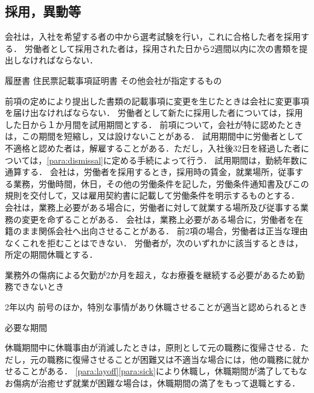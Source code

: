 \documentclass[11pt,a4paper]{jsarticle}
\begin{document}
\subsection{採用，異動等}
会社は，入社を希望する者の中から選考試験を行い，これに合格した者を採用する．
労働者として採用された者は，採用された日から2週間以内に次の書類を提出しなければならない．
\begin{enumerate}
	\itm 履歴書
	\itm 住民票記載事項証明書
	\itm その他会社が指定するもの
\end{enumerate}
\term
前項の定めにより提出した書類の記載事項に変更を生じたときは会社に変更事項を届け出なければならない．
労働者として新たに採用した者については，採用した日から１か月間を試用期間とする．
\term
前項について，会社が特に認めたときは，この期間を短縮し，又は設けないことがある．
\term
試用期間中に労働者として不適格と認めた者は，解雇することがある．ただし，入社後32日を経過した者については，\ref{para:dismissal}に定める手続によって行う．
\term
試用期間は，勤続年数に通算する．
会社は，労働者を採用するとき，採用時の賃金，就業場所，従事する業務，労働時間，休日，その他の労働条件を記した，労働条件通知書及びこの規則を交付して，又は雇用契約書に記載して労働条件を明示するものとする．
会社は，業務上必要がある場合に，労働者に対して就業する場所及び従事する業務の変更を命ずることがある．
\term
会社は，業務上必要がある場合に，労働者を在籍のまま関係会社へ出向させることがある．
\term
前2項の場合，労働者は正当な理由なくこれを拒むことはできない．
\label{para:layoff}
労働者が，次のいずれかに該当するときは，所定の期間休職とする．
\begin{enumerate}
	\itm 業務外の傷病による欠勤が2か月を超え，なお療養を継続する必要があるため勤務できないとき\par 2年以内
	\label{para:sick}
	\itm 前号のほか，特別な事情があり休職させることが適当と認められるとき\par 必要な期間
\end{enumerate}
\term
休職期間中に休職事由が消滅したときは，原則として元の職務に復帰させる．ただし，元の職務に復帰させることが困難又は不適当な場合には，他の職務に就かせることがある．
\term
\ref{para:layoff}\ref{para:sick}により休職し，休職期間が満了してもなお傷病が治癒せず就業が困難な場合は，休職期間の満了をもって退職とする．
\end{document}
